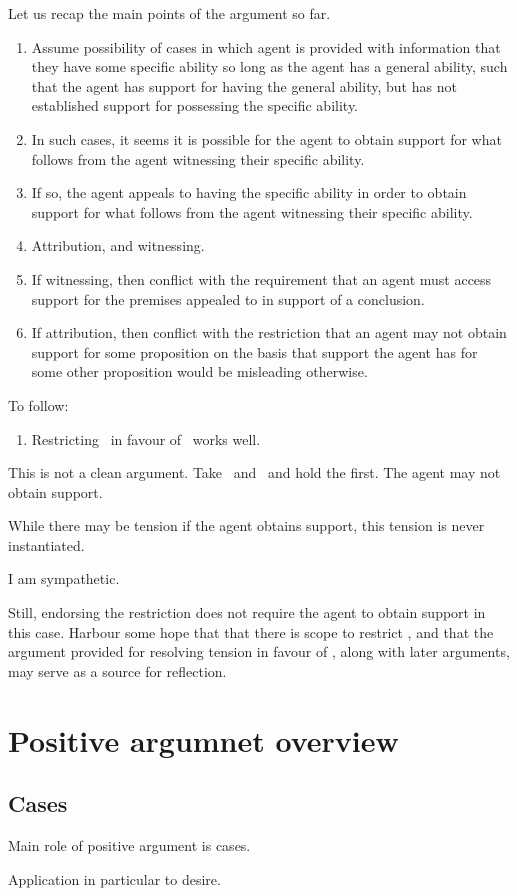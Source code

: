\begin{note}
  Let us recap the main points of the argument so far.
  \begin{enumerate}
  \item Assume possibility of cases in which agent is provided with information that they have some specific ability so long as the agent has a general ability, such that the agent has support for having the general ability, but has not established support for possessing the specific ability.
  \item In such cases, it seems it is possible for the agent to obtain support for what follows from the agent witnessing their specific ability.
  \item If so, the agent appeals to having the specific ability in order to obtain support for what follows from the agent witnessing their specific ability.
  \item Attribution, and witnessing.
  \item If witnessing, then conflict with the requirement that an agent must access support for the premises appealed to in support of a conclusion.
  \item If attribution, then conflict with the restriction that an agent may not obtain support for some proposition on the basis that support the agent has for some other proposition would be misleading otherwise.
  \end{enumerate}

  To follow:
  \begin{enumerate}
  \item Restricting~\uRa{} in favour of~\rC{} works well.
  \end{enumerate}
\end{note}

\begin{note}
  This is not a clean argument.
  Take~\uRa{} and~\nI{} and hold the first.
  The agent may not obtain support.

  While there may be tension if the agent obtains support, this tension is never instantiated.

  I am sympathetic.

  Still, endorsing the restriction does not require the agent to obtain support in this case.
  Harbour some hope that that there is scope to restrict \uRa{}, and that the argument provided for resolving tension in favour of \rC{}, along with later arguments, may serve as a source for reflection.
\end{note}

\section{Positive argumnet overview}
\label{sec:posit-argumn-overv}

\subsection{Cases}
\label{sec:cases}

\begin{note}
  Main role of positive argument is cases.
\end{note}

\begin{note}
  Application in particular to desire.
\end{note}